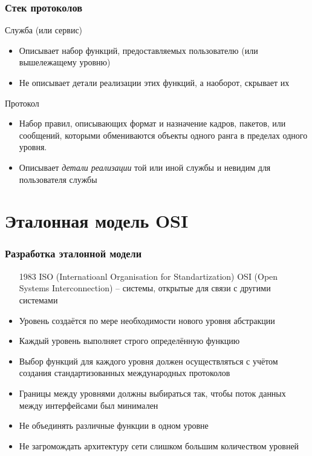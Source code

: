 \documentclass[utf8]{beamer}
\begin{document}
\begin{frame}
 \frametitle{Стек протоколов}
\begin{block}{Служба (или сервис)}
\begin{itemize}
 \item Описывает набор функций, предоставляемых пользователю (или вышележащему уровню)
 \item Не описывает детали реализации этих функций, а наоборот, скрывает их
\end{itemize}
\end{block}
\begin{block}{Протокол}
 \begin{itemize}
  \item Набор правил, описывающих формат и назначение кадров, пакетов, или сообщений, которыми обмениваются объекты одного ранга в пределах одного уровня.
  \item Описывает \emph{детали реализации} той или иной службы и невидим для пользователя службы
 \end{itemize}
\end{block}
\end{frame}
\section{Эталонная модель OSI}
\begin{frame}
 \frametitle{Разработка эталонной модели}
\begin{itemize}
 \item[1983] ISO (Internatioanl Organisation for Standartization) OSI (Open Systems Interconnection) -- системы, открытые для связи с другими системами
 \item Уровень создаётся по мере необходимости нового уровня абстракции
 \item Каждый уровень выполняет строго определённую функцию
 \item Выбор функций для каждого уровня должен осуществляться с учётом создания стандартизованных международных протоколов
 \item Границы между уровнями должны выбираться так, чтобы поток данных между интерфейсами был минимален
 \item Не объединять различные функции в одном уровне
 \item Не загромождать архитектуру сети слишком большим количеством уровней
\end{itemize}
\end{frame}
\end{document}
